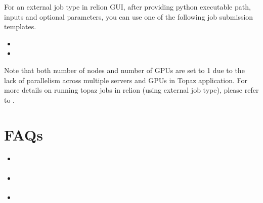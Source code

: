 \documentclass[a4paper,11pt,english]{sphinxmanual}
\begin{document}
\sphinxAtStartPar
For an external job type in relion GUI, after providing python executable path, inputs and optional parameters, you can use one of the following job submission templates.
\begin{itemize}
\item {} 
\sphinxAtStartPar
{}

\item {} 
\sphinxAtStartPar
{}

\end{itemize}



\sphinxAtStartPar
Note that both number of nodes and number of GPUs are set to 1 due to the lack of parallelism across multiple servers and GPUs in Topaz application.
For more details on running topaz jobs in relion (using external job type), please refer to .

\sphinxstepscope


\chapter{FAQs}
\label{\detokenize{faq:faqs}}\label{\detokenize{faq::doc}}\begin{itemize}
\item {} 
\sphinxAtStartPar
{\hyperref[\detokenize{faq:how-to-resolve-the-problems-on-re-starting-your-own-cryosparc-instance}]{}}

\item {} 
\sphinxAtStartPar
{\hyperref[\detokenize{faq:how-to-repair-cryosparc-database-corruption-caused-by-duplicated-mongod-executions}]{}}

\item {} 
\sphinxAtStartPar
{\hyperref[\detokenize{faq:how-to-update-cryosparc-softwares}]{}}

\end{itemize}
\end{document}
